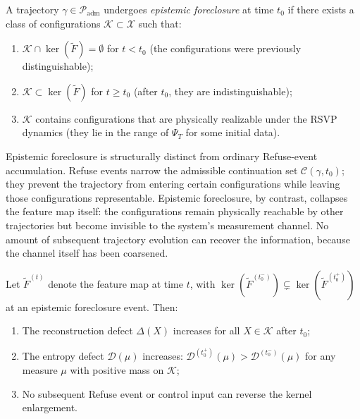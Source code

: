 \documentclass[12pt, oneside]{memoir}
\newcommand{\X}{\mathcal{X}}
\newcommand{\Ft}{\widetilde{F}}
\newcommand{\Padm}{\mathcal{P}_{\mathrm{adm}}}
\begin{document}
\begin{definition}
\label{def:epistemic-foreclosure}
A trajectory $\gamma \in \Padm$ undergoes \emph{epistemic foreclosure} at time $t_0$ if
there exists a class of configurations $\mathcal{K} \subset \X$ such that:
\begin{enumerate}
  \item $\mathcal{K} \cap \ker(\Ft) = \emptyset$ for $t < t_0$ (the configurations were
        previously distinguishable);
  \item $\mathcal{K} \subset \ker(\Ft)$ for $t \geq t_0$ (after $t_0$, they are
        indistinguishable);
  \item $\mathcal{K}$ contains configurations that are physically realizable under the
        RSVP dynamics (they lie in the range of $\Psi_T$ for some initial data).
\end{enumerate}
\end{definition}

Epistemic foreclosure is structurally distinct from ordinary Refuse-event accumulation.
Refuse events narrow the admissible continuation set $\mathcal{C}(\gamma, t_0)$; they
prevent the trajectory from entering certain configurations while leaving those
configurations representable.  Epistemic foreclosure, by contrast, collapses the
feature map itself: the configurations remain physically reachable by other trajectories
but become invisible to the system's measurement channel.  No amount of subsequent
trajectory evolution can recover the information, because the channel itself has been
coarsened.

\begin{proposition}
\label{prop:epi-irrev}
Let $\Ft^{(t)}$ denote the feature map at time $t$, with $\ker(\Ft^{(t_0^-)}) \subsetneq
\ker(\Ft^{(t_0^+)})$ at an epistemic foreclosure event.  Then:
\begin{enumerate}
  \item The reconstruction defect $\Delta(X)$ increases for all $X \in \mathcal{K}$ after
        $t_0$;
  \item The entropy defect $\mathcal{D}(\mu)$ increases: $\mathcal{D}^{(t_0^+)}(\mu) >
        \mathcal{D}^{(t_0^-)}(\mu)$ for any measure $\mu$ with positive mass on
        $\mathcal{K}$;
  \item No subsequent Refuse event or control input can reverse the kernel enlargement.
\end{enumerate}
\end{proposition}
\end{document}

